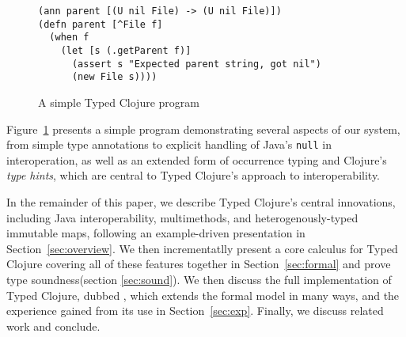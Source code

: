 \begin{figure}
\begin{verbatim}
(ann parent [(U nil File) -> (U nil File)])
(defn parent [^File f]
  (when f
    (let [s (.getParent f)]
      (assert s "Expected parent string, got nil")
      (new File s))))
\end{verbatim}
\caption{A simple Typed Clojure program}
\label{fig:ex1}
\end{figure}
Figure~\ref{fig:ex1} presents a simple program demonstrating several
aspects of our system, from simple type annotations to explicit
handling of Java's \texttt{null} in interoperation, as well as an
extended form of occurrence typing and Clojure's \emph{type hints},
which are central to Typed Clojure's approach to interoperability. 

In the remainder of this paper, we describe Typed Clojure's central
innovations, including Java interoperability, multimethods, and
heterogenously-typed immutable maps, following an example-driven
presentation in Section~\ref{sec:overview}. We then incrementatlly
present a core calculus for Typed Clojure covering all of these
features together in Section~\ref{sec:formal} and prove type
soundness(section \ref{sec:sound}). We then discuss the full
implementation of Typed Clojure, dubbed \coretyped{}, which
extends the formal model in many ways, and the experience gained from
its use in Section~\ref{sec:exp}. Finally, we discuss related work and
conclude. 






